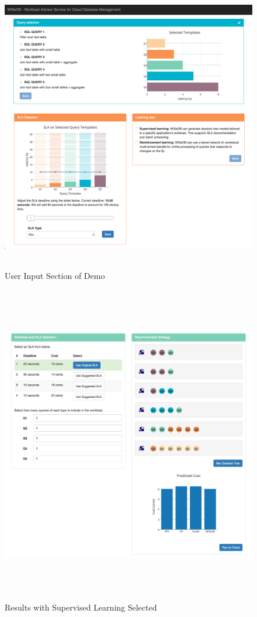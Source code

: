 \documentclass{brandiss}
\numberwithin{section}{chapter}
\numberwithin{figure}{chapter}
\theoremstyle{definition}
\theoremstyle{plain}
\theoremstyle{remark}
\begin{document}
\begin{figure}[htbp]
  \centering
  \includegraphics[height=5in]{demo-screenshot}
  \caption{User Input Section of Demo}
  \label{fig:demo-screenshot}
\end{figure}

\begin{figure}[htbp]
  \centering
  \includegraphics[height=5.5in]{demo-supervised}
  \caption{Results with Supervised Learning Selected}
  \label{fig:demo-supervised}
\end{figure}
\end{document}
